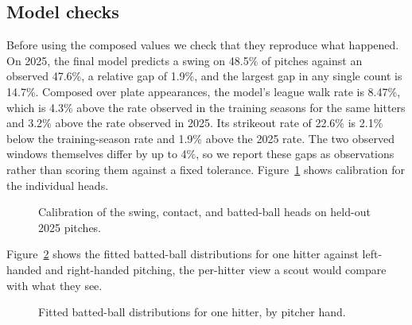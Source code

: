 \documentclass[11pt,letterpaper]{article}
\begin{document}
\subsection{Model checks}
\label{sec:checks}

Before using the composed values we check that they reproduce what happened. On 2025, the final model predicts a swing on 48.5\% of pitches against an observed 47.6\%, a relative gap of 1.9\%, and the largest gap in any single count is 14.7\%. Composed over plate appearances, the model's league walk rate is 8.47\%, which is 4.3\% above the rate observed in the training seasons for the same hitters and 3.2\% above the rate observed in 2025. Its strikeout rate of 22.6\% is 2.1\% below the training-season rate and 1.9\% above the 2025 rate. The two observed windows themselves differ by up to 4\%, so we report these gaps as observations rather than scoring them against a fixed tolerance. Figure~\ref{fig:headcal} shows calibration for the individual heads.

\begin{figure}[t]
\centering
{}
\caption{Calibration of the swing, contact, and batted-ball heads on held-out 2025 pitches.}
\label{fig:headcal}
\end{figure}

Figure~\ref{fig:hitter} shows the fitted batted-ball distributions for one hitter against left-handed and right-handed pitching, the per-hitter view a scout would compare with what they see.

\begin{figure}[t]
\centering
{}
\caption{Fitted batted-ball distributions for one hitter, by pitcher hand.}
\label{fig:hitter}
\end{figure}
\end{document}
